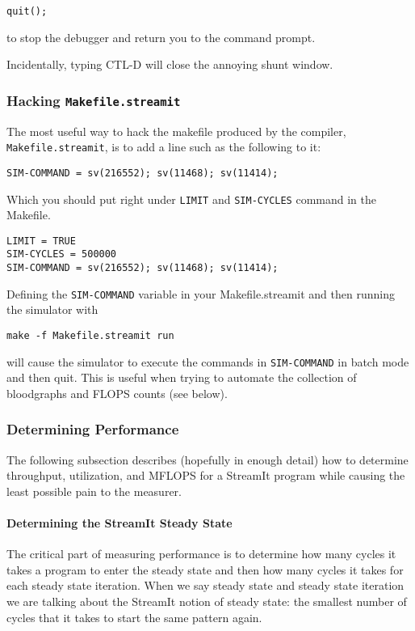 \begin{verbatim}quit();\end{verbatim}

to stop the debugger and return you to the command prompt.

Incidentally, typing CTL-D will close the annoying shunt window.

\subsubsection{Hacking \texttt{Makefile.streamit}}
The most useful way to hack the makefile produced by the compiler,
\texttt{Makefile.streamit}, is to add a line such as the following to it:

\begin{verbatim}SIM-COMMAND = sv(216552); sv(11468); sv(11414);\end{verbatim}

Which you should put right under \texttt{LIMIT} and \texttt{SIM-CYCLES}
command in the Makefile.
\begin{verbatim}
LIMIT = TRUE
SIM-CYCLES = 500000
SIM-COMMAND = sv(216552); sv(11468); sv(11414); 
\end{verbatim}

Defining the \texttt{SIM-COMMAND} variable in your Makefile.streamit and 
then running the simulator with 

\begin{verbatim}make -f Makefile.streamit run\end{verbatim}

will cause the simulator to execute the commands in \texttt{SIM-COMMAND}
in batch mode and then quit. This is useful when trying to automate
the collection of bloodgraphs and FLOPS counts (see below).






\subsubsection{Determining Performance}
The following subsection describes (hopefully in enough detail) how
to determine throughput, utilization, and MFLOPS for a StreamIt program
while causing the least possible pain to the measurer.

\paragraph{Determining the StreamIt Steady State}
The critical part of measuring performance is to determine how many cycles
it takes a program to enter the steady state and then how many cycles
it takes for each steady state iteration. When we say steady state and steady
state iteration we are talking about the StreamIt notion of steady state: the
smallest number of cycles that it takes to start the same pattern again.

